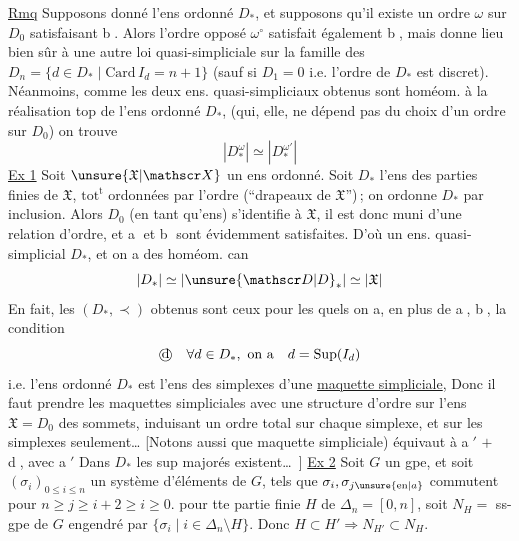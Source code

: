 \uline{Rmq} Supposons donné l'ens ordonné $D_*$,  et supposons qu'il existe un ordre $\omega$ sur $D_0$ satisfaisant \textcircled{b}. Alors l'ordre opposé $\omega^{\circ}$ satisfait également \textcircled{b}, mais donne lieu bien
sûr à une autre loi quasi-simpliciale sur la famille des $D_n=\{d\in D_*\mid\mathrm{Card}\,I_d=n+1\}$ (sauf si $D_1=0$ i.e. l'ordre de $D_*$ est discret).
Néanmoins, comme les  deux ens. quasi-simpliciaux obtenus sont  homéom. à la réalisation top  de l'ens ordonné $D_*$,
(qui, elle, ne dépend pas du choix d'un ordre sur $D_0$) on trouve   
\[
|D_*^{\omega}|\simeq|D_*^{\omega'}|
\]
\uline{Ex 1} Soit $\unsure{\mathfrak X|\mathscr X}$ un ens ordonné. Soit $D_*$ l'ens des parties finies de $\mathfrak X$, $\mathrm{tot}^{\mathrm t}$ ordonnées par l'ordre  (\textquotedblleft drapeaux de $\mathfrak X$\textquotedblright)\,; on ordonne $D_*$ par inclusion.
Alors $D_0$ (en tant qu'ens)  s'identifie à $\mathfrak X$, il est  donc muni d'une relation d'ordre, et \textcircled{a} et \textcircled{b} sont évidemment satisfaites.
D'où un ens. quasi-simplicial $D_*$, et on a des homéom. can
\[
|D_*|\simeq|\unsure{\mathscr D|D}_*|\simeq|\mathfrak X|
\]
En fait, les $(D_*,\prec)$ obtenus sont ceux pour les quels on a, en plus de \textcircled{a}, \textcircled{b},  la condition
\[
\text{\textcircled{d}}\quad\forall d\in D_*,\ \text{on a}\quad d=\mathrm{Sup}(I_d)
\]
i.e. l'ens ordonné $D_*$ est l'ens des simplexes  d'une \uline{maquette simpliciale}, 
Donc il faut prendre les maquettes simpliciales avec une structure d'ordre sur l'ens $\mathfrak X=D_0$ des sommets, induisant un ordre total sur chaque simplexe, et   sur les simplexes seulement\ldots
[Notons aussi que   maquette simpliciale) équivaut à \textcircled{a$'$} $+$  \textcircled{d}, avec
\textcircled{a$'$} Dans $D_*$ les sup  majorés existent\ldots\ ]
\uline{Ex 2} Soit $G$ un gpe, et soit $(\sigma_i)_{0\leq i\leq n}$ un système d'éléments de $G$, tels que $\sigma_i,\sigma_{j\unsure{\mathrm{en}|a}}$ commutent pour  $n\geq j\geq i+2\geq i\geq0$. 
pour tte partie finie $H$ de $\Delta_n=[0,n]$, soit  $N_H=$ ss-gpe de $G$ engendré par $\{\sigma_i\mid i\in\Delta_n\setminus H\}$. Donc $H\subset H'\Rightarrow N_{H'}\subset N_H$.

